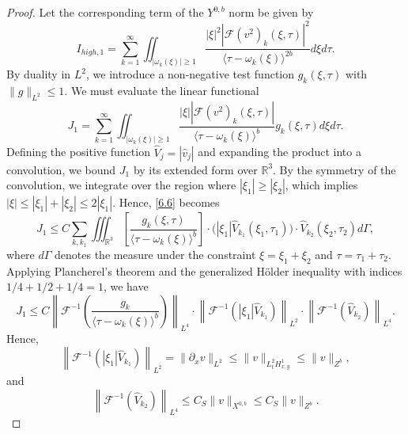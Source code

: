 \documentclass[10pt,a4paper]{amsart}
\begin{document}
\begin{proof}
Let the corresponding term of the $Y^{0,b}$ norm be given by
\begin{equation}
    I_{high,1} = \sum_{k=1}^{\infty} \iint_{|\omega_{k}(\xi)| \ge 1} \frac{|\xi|^{2}
    |\mathcal{F}(v^{2})_{k}(\xi,\tau)|^{2}}{\langle \tau - \omega_{k}(\xi)\rangle^{2b}} d\xi d\tau.
\end{equation}
By duality in $L^2$, we introduce a non-negative test function $g_{k}(\xi,\tau)$ with $\|g\|_{L^2} \le 1$.
We must evaluate the linear functional
\begin{equation}\label{6.6}
    J_{1} = \sum_{k=1}^{\infty} \iint_{|\omega_{k}(\xi)|\geq 1} \frac{|\xi| |\mathcal{F}(v^{2})_k(\xi,\tau)|}{\langle \tau
    - \omega_{k}(\xi)\rangle^{b}} g_{k}(\xi,\tau) d\xi d\tau.
\end{equation}
Defining the positive function $\widehat{V}_{j} = |\widehat{v}_{j}|$
and expanding the product into a convolution, we bound $J_{1}$ by
its extended form over $\mathbb{R}^{3}$. By the symmetry of the
convolution, we integrate over the region where $|\xi_{1}| \ge
|\xi_{2}|$, which implies $|\xi| \le |\xi_{1}| + |\xi_{2}| \le
2|\xi_{1}|$. Hence, \eqref{6.6} becomes
\begin{equation}
    J_{1} \leq C\sum_{k,k_{1}} \iiint_{\mathbb{R}^{3}} \left[ \frac{g_{k}(\xi,\tau)}{\langle \tau -
    \omega_{k}(\xi)\rangle^{b}} \right] \cdot \Big( |\xi_{1}| \widehat{V}_{k_{1}}(\xi_{1},\tau_{1}) \Big) \cdot \widehat{V}_{k_{2}}(\xi_{2},\tau_{2}) d\Gamma,
\end{equation}
where $d\Gamma$ denotes the measure under the constraint $\xi =
\xi_{1}+\xi_{2}$ and $\tau = \tau_{1}+\tau_{2}$. Applying
Plancherel's theorem and the generalized Hölder inequality with
indices $1/4 + 1/2 + 1/4 = 1$, we have
\begin{equation}
J_{1} \leq C\left\|\mathcal{F}^{-1}\left(\frac{g_{k}}{\langle \tau - \omega_{k}(\xi)
\rangle^{b}}\right)\right\|_{L^{4}} \cdot \left\|\mathcal{F}^{-1}\left(|\xi_1|
\widehat{V}_{k_{1}}\right)\right\|_{L^{2}} \cdot \left\|\mathcal{F}^{-1}\left(\widehat{V}_{k_{2}}\right)\right\|_{L^{4}}.
\end{equation}
Hence,
\begin{equation}
\left\|\mathcal{F}^{-1}\left(|\xi_1| \widehat{V}_{k_{1}}\right)\right\|_{L^{2}}= \|\partial_{x} v\|_{L^{2}} \leq \|v\|_{L^{2}_{t} H^{1}_{x,y}} \leq \|v\|_{Z^{b}},
\end{equation}
and
\begin{equation}
\left\|\mathcal{F}^{-1}\left(\widehat{V}_{k_{2}}\right)\right\|_{L^{4}} \leq C_{S} \|v\|_{X^{0,b}} \leq C_{S} \|v\|_{Z^{b}}.

\end{equation}
\end{proof}
\end{document}
